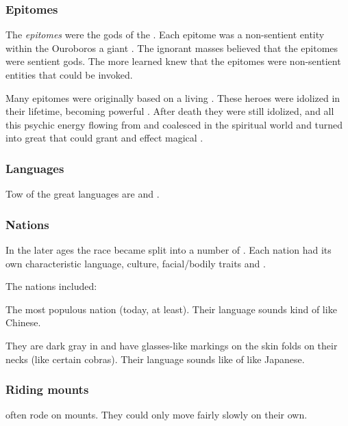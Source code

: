 \subsubsection{Epitomes}
%
The \emph{epitomes} were the gods of the \caisith.
Each epitome was a non-sentient entity within the Ouroboros \nexus\dash a giant \daemon. 
The ignorant masses believed that the epitomes were sentient gods.
The more learned knew that the epitomes were non-sentient entities that could be invoked. 

Many epitomes were originally based on a living \caisith. 
These heroes were idolized in their lifetime, becoming powerful . 
After death they were still idolized, and all this psychic energy flowing from  and  coalesced in the spiritual world and turned into great \daemons that could grant  and effect magical . 





\subsubsection{Languages}
Tow of the great \caisith languages are  and . 





\subsubsection{Nations}
In the later ages the \quiljaaran{} race became split into a number of . 
Each nation had its own characteristic language, culture, facial/bodily traits and \colours. 

The nations included:
\begin{gloss}

  \gitem{\KyanHweDin:} 
  The most populous nation (today, at least). 
  Their language sounds kind of like Chinese. 
  
  \gitem{\Okiriru:}
  They are dark gray in \colour and have glasses-like markings on the skin folds on their necks (like certain cobras). 
  Their language sounds like of like Japanese. 
\end{gloss}





\subsubsection{Riding mounts}
\Ophidians often rode on mounts. 
They could only move fairly slowly on their own. 

